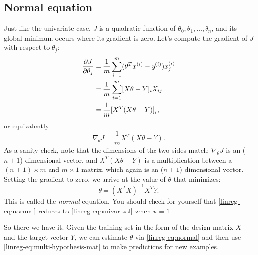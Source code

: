 \documentclass{article}
\theoremstyle{definition}
\begin{document}
\subsection{Normal equation}
\label{linreg-sec:normaleq}
Just like the univariate case, $J$ is a quadratic function of $\theta_0, \theta_1, \dots, \theta_n$, and its global minimum occurs where its gradient is zero. Let's compute the gradient of $J$ with respect to $\theta_j$:
\begin{align}
    \frac{\partial J}{\partial \theta_j} &= \frac{1}{m}\sum_{i=1}^{m}(\theta^Tx^{(i)} - y^{(i)})x^{(i)}_j\notag\\
    &=\frac{1}{m}\sum_{i=1}^{m}[X\theta - Y]_iX_{ij}\notag\\
    &=\frac{1}{m}[X^T(X\theta - Y)]_j,\label{linreg-eq:costfunc-mat}
\end{align}
or equivalently
\begin{equation}
    \nabla_{\theta} J = \frac{1}{m}X^T(X\theta - Y).
\end{equation}
As a sanity check, note that the dimensions of the two sides match: $\nabla_{\theta} J$ is an ($n+1$)-dimensional vector, and $X^T(X\theta - Y)$ is a multiplication between a $(n+1) \times m$ and $m \times 1$ matrix, which again is an ($n+1$)-dimensional vector. Setting the gradient to zero, we arrive at the value of $\theta$ that minimizes:
\begin{equation}
    \theta = \left(X^TX\right)^{-1}X^TY.
    \label{linreg-eq:normal}
\end{equation}
This is called the \textit{normal} equation. You should check for yourself that \eqref{linreg-eq:normal} reduces to \eqref{linreg-eq:univar-sol} when $n = 1$.

So there we have it. Given the training set in the form of the design matrix $X$ and the target vector $Y$, we can estimate $\theta$ via \eqref{linreg-eq:normal} and then use \eqref{linreg-eq:multi-hypothesis-mat} to make predictions for new examples.


\end{document}
